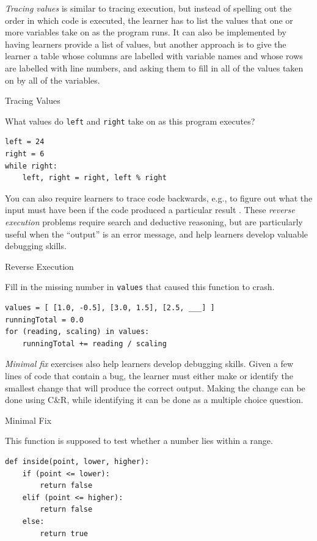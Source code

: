 \emph{Tracing values} is similar to tracing execution, but instead of
spelling out the order in which code is executed, the learner has to
list the values that one or more variables take on as the program
runs. It can also be implemented by having learners provide a list of
values, but another approach is to give the learner a table whose
columns are labelled with variable names and whose rows are labelled
with line numbers, and asking them to fill in all of the values taken
on by all of the variables.

\begin{callout}{Tracing Values}

  What values do \texttt{left} and \texttt{right} take on as this
  program executes?

\begin{verbatim}
left = 24
right = 6
while right:
    left, right = right, left % right
\end{verbatim}

\end{callout}

You can also require learners to trace code backwards, e.g., to figure
out what the input must have been if the code produced a particular
result \cite{Armo2008}.  These \emph{reverse execution} problems
require search and deductive reasoning, but are particularly useful
when the ``output'' is an error message, and help learners develop
valuable debugging skills.

\begin{callout}{Reverse Execution}

  Fill in the missing number in \texttt{values} that caused this
  function to crash.

\begin{verbatim}
values = [ [1.0, -0.5], [3.0, 1.5], [2.5, ___] ]
runningTotal = 0.0
for (reading, scaling) in values:
    runningTotal += reading / scaling
\end{verbatim}
  
\end{callout}

\emph{Minimal fix} exercises also help learners develop debugging
skills.  Given a few lines of code that contain a bug, the learner
must either make or identify the smallest change that will produce the
correct output. Making the change can be done using C\&R, while
identifying it can be done as a multiple choice question.

\begin{callout}{Minimal Fix}

  This function is supposed to test whether a number lies within a
  range.

\begin{verbatim}
def inside(point, lower, higher):
    if (point <= lower):
        return false
    elif (point <= higher):
        return false
    else:
        return true
\end{verbatim}

\end{callout}

